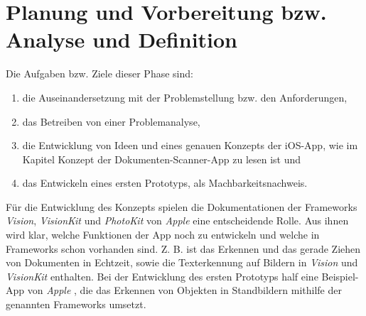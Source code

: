 \documentclass[nomenclature, onesided, 150]{HSMW-Thesis}
\begin{document}
	\section{Planung und Vorbereitung bzw. Analyse und Definition}
		Die Aufgaben bzw. Ziele dieser Phase sind:
		\begin{enumerate}
			\item die Auseinandersetzung mit der Problemstellung bzw. den Anforderungen,
			\item das Betreiben von einer Problemanalyse,
			\item die Entwicklung von Ideen und eines genauen Konzepts der iOS-App, wie im Kapitel Konzept der Dokumenten-Scanner-App zu lesen ist und 
			\item das Entwickeln eines ersten Prototyps, als Machbarkeitsnachweis.
		\end{enumerate}
		
		Für die Entwicklung des Konzepts spielen die Dokumentationen der Frameworks \textit{Vision}, \textit{VisionKit} und \textit{PhotoKit} von \textit{Apple} eine entscheidende Rolle. Aus ihnen wird klar, welche Funktionen der App noch zu entwickeln und welche in Frameworks schon vorhanden sind. Z. B. ist das Erkennen und das gerade Ziehen von Dokumenten in Echtzeit, sowie die Texterkennung auf Bildern in \textit{Vision} und \textit{VisionKit} enthalten. Bei der Entwicklung des ersten Prototyps half eine Beispiel-App von \textit{Apple} \cite{noauthor_detecting_nodate}, die das Erkennen von Objekten in Standbildern mithilfe der genannten Frameworks umsetzt.
		
\end{document}
